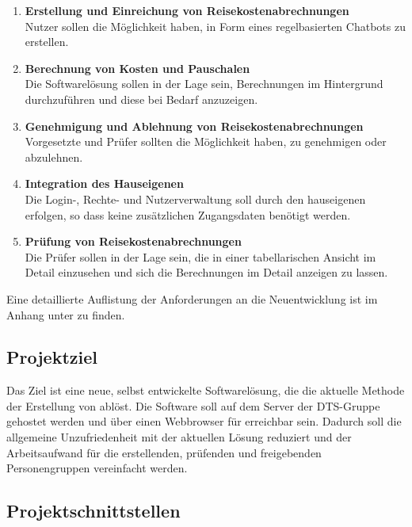\begin{enumerate}
    \item \textbf{Erstellung und Einreichung von Reisekostenabrechnungen}\\
    Nutzer sollen die Möglichkeit haben,  in Form eines regelbasierten Chatbots zu erstellen.
    \item \textbf{Berechnung von Kosten und Pauschalen}\\
    Die Softwarelösung sollen in der Lage sein, Berechnungen im Hintergrund durchzuführen und diese bei Bedarf anzuzeigen.
    \item \textbf{Genehmigung und Ablehnung von Reisekostenabrechnungen}\\
    Vorgesetzte und Prüfer sollten die Möglichkeit haben,  zu genehmigen oder abzulehnen.
    \item \textbf{Integration des Hauseigenen }\\
    Die Login-, Rechte- und Nutzerverwaltung soll durch den hauseigenen  erfolgen, so dass keine zusätzlichen Zugangsdaten benötigt werden.
    \item \textbf{Prüfung von Reisekostenabrechnungen}\\
    Die Prüfer sollen in der Lage sein, die  in einer tabellarischen Ansicht im Detail einzusehen und sich die Berechnungen im Detail anzeigen zu lassen.
\end{enumerate}

Eine detaillierte Auflistung der Anforderungen an die Neuentwicklung ist im Anhang unter  zu finden.


\subsection{Projektziel}
\label{sec:Einführung-Definitionsphase:Projektziel}

Das Ziel ist eine neue, selbst entwickelte Softwarelösung, die die aktuelle Methode der Erstellung von  ablöst. Die Software soll auf dem Server der DTS-Gruppe gehostet werden und über einen Webbrowser für  erreichbar sein. Dadurch soll die allgemeine Unzufriedenheit mit der aktuellen Lösung reduziert und der Arbeitsaufwand für die erstellenden, prüfenden und freigebenden Personengruppen vereinfacht werden.

\subsection{Projektschnittstellen}
\label{sec:Einführung-Definitionsphase:Projektschnittstellen}

